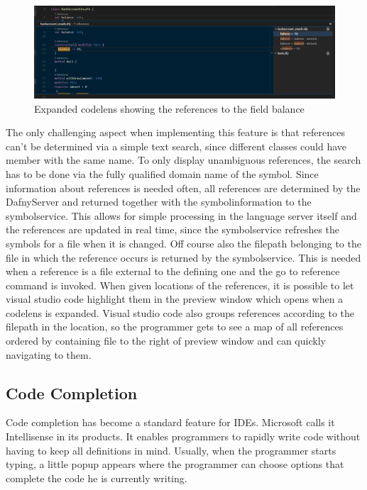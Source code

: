 \begin{figure}[H]
	\centering
	\includegraphics[width=1\textwidth]{img/codelensesExpanded}
	\caption{Expanded codelens showing the references to the field balance}
	\label{fig:codelensesexpanded}
\end{figure}

The only challenging aspect when implementing this feature is that references can't be determined via a simple text search, since different classes could have member with the same name. To only display unambiguous references, the search has to be done via the fully qualified domain name of the symbol. Since information about references is needed often, all references are determined by the DafnyServer and returned together with the symbolinformation to the symbolservice. This allows for simple processing in the language server itself and the references are updated in real time, since the symbolservice refreshes the symbols for a file when it is changed. Off course also the filepath belonging to the file in which the reference occurs is returned by the symbolservice. This is needed when a reference is a file external to the defining one and the go to reference command is invoked.\newline
When given locations of the references, it is possible to let visual studio code highlight them in the preview window which opens when a codelens is expanded. Visual studio code also groups references according to the filepath in the location, so the programmer gets to see a map of all references ordered by containing file to the right of preview window and can quickly navigating to them.

 \subsection{Code Completion} \label{codecompletion}
 Code completion has become a standard feature for IDEs. Microsoft calls it Intellisense in its products. It enables programmers to rapidly write code without having to keep all definitions in mind. Usually, when the programmer starts typing, a little popup appears where the programmer can choose options that complete the code he is currently writing. \newline
 
